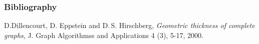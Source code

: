 \documentclass[12 pt]{beamer}
\begin{document}
\begin{frame}{}
    \frametitle{Bibliography}
    
    
    \begin{thebibliography}{ABC9999}

    D.Dillencourt, D. Eppstein and D.\,S. Hirschberg,
    \textit{Geometric thickness of complete graphs}, 
        J. Graph Algorithmss and Applications 4 (3), 5-17, 2000.
	    
    
    \end{thebibliography}
        
\end{frame}
\end{document}
